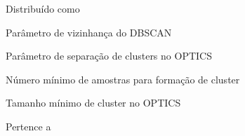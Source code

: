 \begin{simbolos}
  \item[$\sim$] Distribuído como

    
  \item[$\epsilon$] Parâmetro de vizinhança do DBSCAN

  \item[$\xi$] Parâmetro de separação de clusters no OPTICS

  \item[$\mathrm{min\_samples}$] Número mínimo de amostras para formação de cluster

  \item[$\mathrm{min\_cluster\_size}$] Tamanho mínimo de cluster no OPTICS
  
  \item[$\in$] Pertence a
\end{simbolos}



